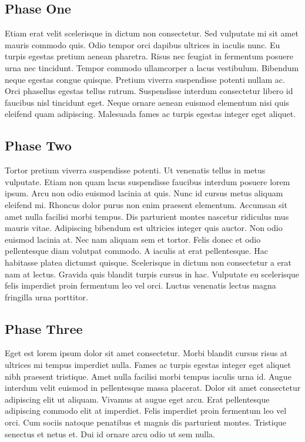 \documentclass[10pt]{article}
\begin{document}
\subsection{Phase One}
Etiam erat velit scelerisque in dictum non consectetur. Sed vulputate mi sit amet mauris commodo quis. Odio tempor orci dapibus ultrices in iaculis nunc. Eu turpis egestas pretium aenean pharetra. Risus nec feugiat in fermentum posuere urna nec tincidunt. Tempor commodo ullamcorper a lacus vestibulum. Bibendum neque egestas congue quisque. Pretium viverra suspendisse potenti nullam ac. Orci phasellus egestas tellus rutrum. Suspendisse interdum consectetur libero id faucibus nisl
tincidunt eget. Neque ornare aenean euismod elementum nisi quis eleifend quam adipiscing. Malesuada fames ac turpis egestas integer eget aliquet.

\subsection{Phase Two}
Tortor pretium viverra suspendisse potenti. Ut venenatis tellus in metus vulputate. Etiam non quam lacus suspendisse faucibus interdum posuere lorem ipsum. Arcu non odio euismod lacinia at quis. Nunc id cursus metus aliquam eleifend mi. Rhoncus dolor purus non enim praesent elementum. Accumsan sit amet nulla facilisi morbi tempus. Dis parturient montes nascetur ridiculus mus mauris vitae. Adipiscing bibendum est ultricies integer quis auctor. Non odio euismod lacinia at. Nec nam
aliquam sem et tortor. Felis donec et odio pellentesque diam volutpat commodo. A iaculis at erat pellentesque. Hac habitasse platea dictumst quisque. Scelerisque in dictum non consectetur a erat nam at lectus. Gravida quis blandit turpis cursus in hac. Vulputate eu scelerisque felis imperdiet proin fermentum leo vel orci. Luctus venenatis lectus magna fringilla urna porttitor.

\subsection{Phase Three}
Eget est lorem ipsum dolor sit amet consectetur. Morbi blandit cursus risus at ultrices mi tempus imperdiet nulla. Fames ac turpis egestas integer eget aliquet nibh praesent tristique. Amet nulla facilisi morbi tempus iaculis urna id. Augue interdum velit euismod in pellentesque massa placerat. Dolor sit amet consectetur adipiscing elit ut aliquam. Vivamus at augue eget arcu. Erat pellentesque adipiscing commodo elit at imperdiet. Felis imperdiet proin fermentum leo vel orci. Cum sociis
natoque penatibus et magnis dis parturient montes. Tristique senectus et netus et. Dui id ornare arcu odio ut sem nulla.


\pagebreak
\appendix
\end{document}
